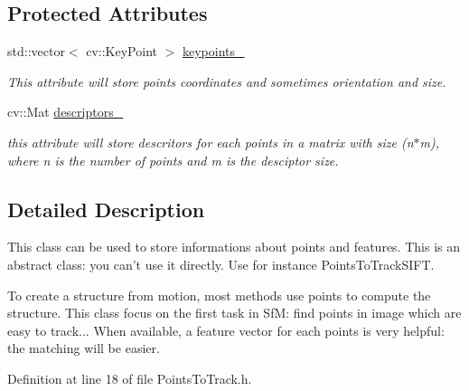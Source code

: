 \subsection*{Protected Attributes}
\begin{DoxyCompactItemize}
\item 
\hypertarget{class_opencv_sf_m_1_1_points_to_track_a08c9523080571e71e30b11a2f8b9c6b9}{
std::vector$<$ cv::KeyPoint $>$ \hyperlink{class_opencv_sf_m_1_1_points_to_track_a08c9523080571e71e30b11a2f8b9c6b9}{keypoints\_\-}}
\label{class_opencv_sf_m_1_1_points_to_track_a08c9523080571e71e30b11a2f8b9c6b9}

\begin{DoxyCompactList}\small\item\em This attribute will store points coordinates and sometimes orientation and size. \end{DoxyCompactList}\item 
\hypertarget{class_opencv_sf_m_1_1_points_to_track_adcbf3783bdf4a2a1d3e10c4b74224899}{
cv::Mat \hyperlink{class_opencv_sf_m_1_1_points_to_track_adcbf3783bdf4a2a1d3e10c4b74224899}{descriptors\_\-}}
\label{class_opencv_sf_m_1_1_points_to_track_adcbf3783bdf4a2a1d3e10c4b74224899}

\begin{DoxyCompactList}\small\item\em this attribute will store descritors for each points in a matrix with size (n$\ast$m), where n is the number of points and m is the desciptor size. \end{DoxyCompactList}\end{DoxyCompactItemize}


\subsection{Detailed Description}
This class can be used to store informations about points and features. This is an abstract class: you can't use it directly. Use for instance PointsToTrackSIFT. 

To create a structure from motion, most methods use points to compute the structure. This class focus on the first task in SfM: find points in image which are easy to track... When available, a feature vector for each points is very helpful: the matching will be easier. 

Definition at line 18 of file PointsToTrack.h.



